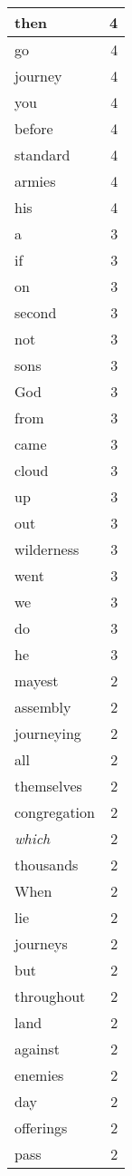 \begin{center}
\begin{longtable}{l|r}
then & 4 \\ \hline
go & 4 \\ \hline
journey & 4 \\ \hline
you & 4 \\ \hline
before & 4 \\ \hline
standard & 4 \\ \hline
armies & 4 \\ \hline
his & 4 \\ \hline
a & 3 \\ \hline
if & 3 \\ \hline
on & 3 \\ \hline
second & 3 \\ \hline
not & 3 \\ \hline
sons & 3 \\ \hline
God & 3 \\ \hline
from & 3 \\ \hline
came & 3 \\ \hline
cloud & 3 \\ \hline
up & 3 \\ \hline
out & 3 \\ \hline
wilderness & 3 \\ \hline
went & 3 \\ \hline
we & 3 \\ \hline
do & 3 \\ \hline
he & 3 \\ \hline
mayest & 2 \\ \hline
assembly & 2 \\ \hline
journeying & 2 \\ \hline
all & 2 \\ \hline
themselves & 2 \\ \hline
congregation & 2 \\ \hline
\emph{which} & 2 \\ \hline
thousands & 2 \\ \hline
When & 2 \\ \hline
lie & 2 \\ \hline
journeys & 2 \\ \hline
but & 2 \\ \hline
throughout & 2 \\ \hline
land & 2 \\ \hline
against & 2 \\ \hline
enemies & 2 \\ \hline
day & 2 \\ \hline
offerings & 2 \\ \hline
pass & 2 \\ \hline

\end{longtable}
\end{center}
